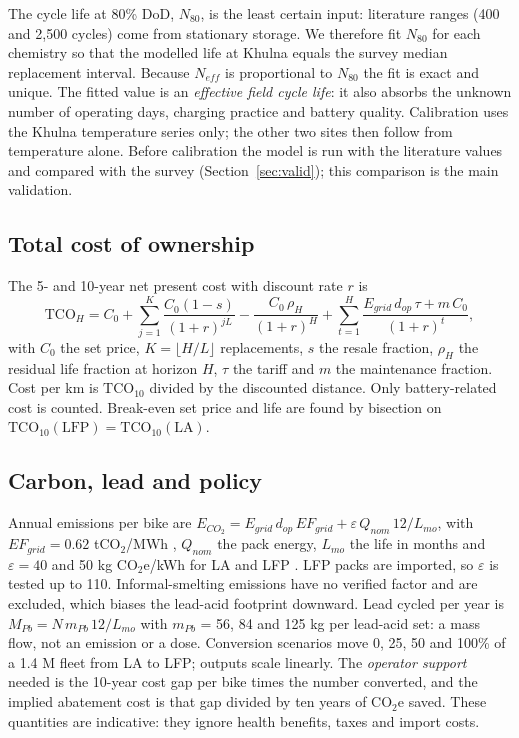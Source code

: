 \documentclass[11pt,a4paper]{article}
\begin{document}
The cycle life at 80\% DoD, $N_{80}$, is the least certain input: literature ranges (400 and 2{,}500 cycles) come from stationary storage. We therefore fit $N_{80}$ for each chemistry so that the modelled life at Khulna equals the survey median replacement interval. Because $N_{eff}$ is proportional to $N_{80}$ the fit is exact and unique. The fitted value is an \emph{effective field cycle life}: it also absorbs the unknown number of operating days, charging practice and battery quality. Calibration uses the Khulna temperature series only; the other two sites then follow from temperature alone. Before calibration the model is run with the literature values and compared with the survey (Section~\ref{sec:valid}); this comparison is the main validation.

\subsection{Total cost of ownership}
The 5- and 10-year net present cost with discount rate $r$ is
\begin{equation}
\mathrm{TCO}_H=C_0+\sum_{j=1}^{K}\frac{C_0(1-s)}{(1+r)^{jL}}-\frac{C_0\,\rho_H}{(1+r)^{H}}+\sum_{t=1}^{H}\frac{E_{grid}\,d_{op}\,\tau + m\,C_0}{(1+r)^t},
\end{equation}
with $C_0$ the set price, $K=\lfloor H/L\rfloor$ replacements, $s$ the resale fraction, $\rho_H$ the residual life fraction at horizon $H$, $\tau$ the tariff and $m$ the maintenance fraction. Cost per km is $\mathrm{TCO}_{10}$ divided by the discounted distance. Only battery-related cost is counted. Break-even set price and life are found by bisection on $\mathrm{TCO}_{10}(\mathrm{LFP})=\mathrm{TCO}_{10}(\mathrm{LA})$.

\subsection{Carbon, lead and policy}
Annual emissions per bike are $E_{CO_2}=E_{grid}\,d_{op}\,EF_{grid}+\varepsilon\,Q_{nom}\,12/L_{mo}$, with $EF_{grid}=0.62$ tCO$_2$/MWh \cite{doe_gef}, $Q_{nom}$ the pack energy, $L_{mo}$ the life in months and $\varepsilon=40$ and 50 kg CO$_2$e/kWh for LA and LFP \cite{jasper2025}. LFP packs are imported, so $\varepsilon$ is tested up to 110. Informal-smelting emissions have no verified factor and are excluded, which biases the lead-acid footprint downward. Lead cycled per year is $M_{Pb}=N\,m_{Pb}\,12/L_{mo}$ with $m_{Pb}$ = 56, 84 and 125 kg per lead-acid set: a mass flow, not an emission or a dose. Conversion scenarios move 0, 25, 50 and 100\% of a 1.4 M fleet from LA to LFP; outputs scale linearly. The \emph{operator support} needed is the 10-year cost gap per bike times the number converted, and the implied abatement cost is that gap divided by ten years of CO$_2$e saved. These quantities are indicative: they ignore health benefits, taxes and import costs.
\end{document}
